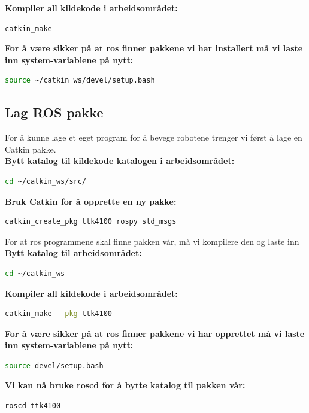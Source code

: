 \documentclass{article}
\begin{document}
\noindent\textbf{Kompiler all kildekode i arbeidsområdet:}
\begin{lstlisting}[language=bash]
catkin_make
\end{lstlisting}

\noindent\textbf{For å være sikker på at \gls{ros} finner pakkene vi har installert må vi laste inn system-variablene på nytt:}
\begin{lstlisting}[language=bash]
source ~/catkin_ws/devel/setup.bash 
\end{lstlisting}

\subsection{Lag ROS pakke}
\label{create_package}
For å kunne lage et eget program for å bevege robotene trenger vi først å lage en Catkin pakke. \\

\noindent\textbf{Bytt katalog til kildekode katalogen i arbeidsområdet:}
\begin{lstlisting}[language=bash]
cd ~/catkin_ws/src/
\end{lstlisting}

\noindent\textbf{Bruk Catkin for å opprette en ny pakke:}
\begin{lstlisting}[language=bash]
catkin_create_pkg ttk4100 rospy std_msgs 
\end{lstlisting}

For at \gls{ros} programmene skal finne pakken vår, må vi kompilere den og laste inn 
\noindent\textbf{Bytt katalog til arbeidsområdet:}
\begin{lstlisting}[language=bash]
cd ~/catkin_ws
\end{lstlisting}

\noindent\textbf{Kompiler all kildekode i arbeidsområdet:}
\begin{lstlisting}[language=bash]
catkin_make --pkg ttk4100
\end{lstlisting}

\noindent\textbf{For å være sikker på at \gls{ros} finner pakkene vi har opprettet må vi laste inn system-variablene på nytt:}
\begin{lstlisting}[language=bash]
source devel/setup.bash 
\end{lstlisting}

\noindent\textbf{Vi kan nå bruke roscd for å bytte katalog til pakken vår:}
\begin{lstlisting}[language=bash]
roscd ttk4100
\end{lstlisting}
\end{document}
